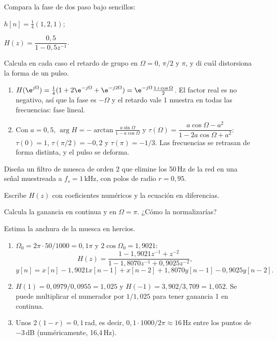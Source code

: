 \documentclass[11pt,a4paper]{scrartcl}
\begin{document}
\begin{ejercicio}
  Compara la fase de dos paso bajo sencillos:
  \begin{incisos}[2]
    \item $h[n]=\frac14(1,2,1)$;
    \item $H(z)=\dfrac{0{,}5}{1-0{,}5z^{-1}}$.
  \end{incisos}
  Calcula en cada caso el retardo de grupo en $\Omega=0$, $\pi/2$ y $\pi$, y di cuál distorsiona la forma de un pulso.
\end{ejercicio}
\begin{solucion}
  \begin{enumerate}[label=\alph*)]
    \item $H(\e^{j\Omega})=\frac14(1+2\e^{-j\Omega}+\e^{-j2\Omega})=\e^{-j\Omega}\frac{1+\cos\Omega}{2}$. El factor real es no negativo, así que la fase es $-\Omega$ y el retardo vale 1 muestra en todas las frecuencias: fase lineal.
    \item Con $a=0{,}5$, $\arg H=-\arctan\frac{a\sin\Omega}{1-a\cos\Omega}$ y $\tau(\Omega)=\dfrac{a\cos\Omega-a^2}{1-2a\cos\Omega+a^2}$: $\tau(0)=1$, $\tau(\pi/2)=-0{,}2$ y $\tau(\pi)=-1/3$. Las frecuencias se retrasan de forma distinta, y el pulso se deforma.
  \end{enumerate}
\end{solucion}

\begin{ejercicio}
  Diseña un filtro de muesca de orden 2 que elimine los 50\,Hz de la red en una señal muestreada a $f_s=1$\,kHz, con polos de radio $r=0{,}95$.
  \begin{incisos}[1]
    \item Escribe $H(z)$ con coeficientes numéricos y la ecuación en diferencias.
    \item Calcula la ganancia en continua y en $\Omega=\pi$. ¿Cómo la normalizarías?
    \item Estima la anchura de la muesca en hercios.
  \end{incisos}
\end{ejercicio}
\begin{solucion}
  \begin{enumerate}[label=\alph*)]
    \item $\Omega_0=2\pi\cdot50/1000=0{,}1\pi$ y $2\cos\Omega_0=1{,}9021$:
    \[
      H(z)=\frac{1-1{,}9021z^{-1}+z^{-2}}{1-1{,}8070z^{-1}+0{,}9025z^{-2}},
    \]
    \[
      y[n]=x[n]-1{,}9021x[n-1]+x[n-2]+1{,}8070y[n-1]-0{,}9025y[n-2].
    \]
    \item $H(1)=0{,}0979/0{,}0955=1{,}025$ y $H(-1)=3{,}902/3{,}709=1{,}052$. Se puede multiplicar el numerador por $1/1{,}025$ para tener ganancia 1 en continua.
    \item Unos $2(1-r)=0{,}1$\,rad, es decir, $0{,}1\cdot1000/2\pi\approx16$\,Hz entre los puntos de $-3$\,dB (numéricamente, 16,4\,Hz).
  \end{enumerate}
\end{solucion}
\end{document}
